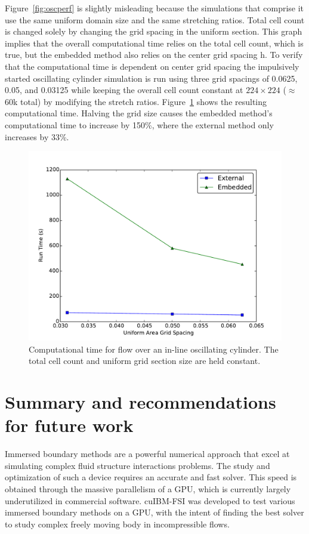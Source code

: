 Figure~\ref{fig:oscperf} is slightly misleading because the simulations that comprise it use the same uniform domain size and the same stretching ratios. 
Total cell count is changed solely by changing the grid spacing in the uniform section. 
This graph implies that the overall computational time relies on the total cell count, which is true, but the embedded method also relies on the center grid spacing h. 
To verify that the computational time is dependent on center grid spacing the impulsively started oscillating cylinder simulation is run using three grid spacings of 0.0625, 0.05, and 0.03125 while keeping the overall cell count constant at $224\times224$ ($\approx$60k total) by modifying the stretch ratios. 
Figure~\ref{fig:performance2} shows the resulting computational time. 
Halving the grid size causes the embedded method's computational time to increase by 150\%, where the external method only increases by 33\%.
\begin{figure}[!htb]
	\centering
	\par\medskip
	\includegraphics[width=0.6\linewidth]{performance_oscflow2}
	\caption{Computational time for flow over an in-line oscillating cylinder. The total cell count and uniform grid section size are held constant.}
	\label{fig:performance2}
\end{figure}

\chapter{Summary and recommendations for future work} 
Immersed boundary methods are a powerful numerical approach that excel at simulating complex fluid structure interactions problems. 
The study and optimization of such a device requires an accurate and fast solver. 
This speed is obtained through the massive parallelism of a GPU, which is currently largely underutilized in commercial software. 
cuIBM-FSI was developed to test various immersed boundary methods on a GPU, with the intent of finding the best solver to study complex freely moving body in incompressible flows. 

